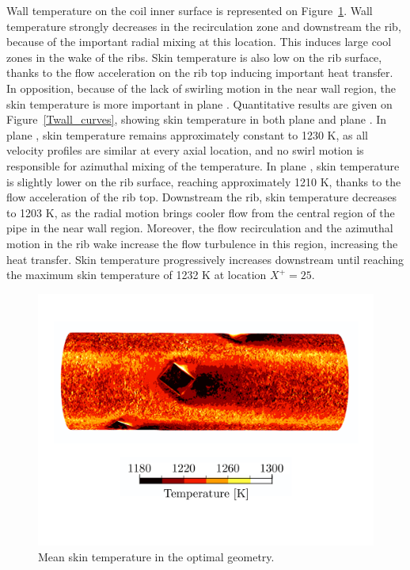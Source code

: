 Wall temperature on the coil inner surface is represented on Figure~\ref{Twall}. Wall temperature strongly decreases in the recirculation zone and downstream the rib, because of the important radial mixing at this location. This induces large cool zones in the wake of the ribs. Skin temperature is also low on the rib surface, thanks to the flow acceleration on the rib top inducing important heat transfer. In opposition, because of the lack of swirling motion in the near wall region, the skin temperature is more important in plane . Quantitative results are given on Figure~\ref{Twall_curves}, showing skin temperature in both plane  and plane . In plane , skin temperature remains approximately constant to 1230 K, as all velocity profiles are similar at every axial location, and no swirl motion is responsible for azimuthal mixing of the temperature. In plane , skin temperature is slightly lower on the rib surface, reaching approximately 1210 K, thanks to the flow acceleration of the rib top. Downstream the rib, skin temperature decreases to 1203 K, as the radial motion brings cooler flow from the central region of the pipe in the near wall region. Moreover, the flow recirculation and the azimuthal motion in the rib wake increase the flow turbulence in this region, increasing the heat transfer. Skin temperature progressively increases downstream until reaching the maximum skin temperature of 1232 K at location $X^+=25$.\\

\begin{figure}[!h]
\centering
\includegraphics[width=\linewidth]{fig/applications/optim/Twall.pdf}
\caption{Mean skin temperature in the optimal geometry.}
\label{Twall}
\end{figure}

